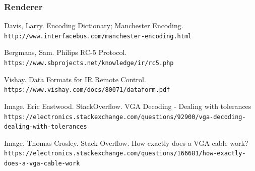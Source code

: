 \documentclass[]{article}
\begin{document}
\subsubsection{Renderer}


\begin{thebibliography}{99}
    Davis, Larry. Encoding Dictionary; Manchester Encoding.
    \\\texttt{http://www.interfacebus.com/manchester-encoding.html}

    Bergmans, Sam. Philips RC-5 Protocol.
    \\\texttt{https://www.sbprojects.net/knowledge/ir/rc5.php}

    Vishay. Data Formats for IR Remote Control. 
    \\\texttt{https://www.vishay.com/docs/80071/dataform.pdf}
    
    Image. Eric Eastwood. StackOverflow.  VGA Decoding - Dealing with tolerances
    \\\texttt{https://electronics.stackexchange.com/questions/92900/vga-decoding-dealing-with-tolerances}
    
    Image. Thomas Crosley. Stack Overflow.  How exactly does a VGA cable work?
    \\\texttt{https://electronics.stackexchange.com/questions/166681/how-exactly-does-a-vga-cable-work}
\end{thebibliography}
\end{document}
